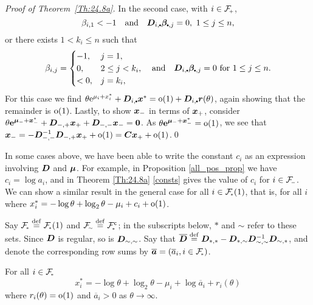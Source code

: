 \begin{proof} [Proof of Theorem~{\rm \ref{Th:24.8a}}]
In the second case, with $i\in \Fset{+}$,
\[
 \beta_{i,1}<-1 \quad \text{and} \quad
 \bfD_{i,\sbullet}  \bfbeta_{\sbullet,j}=0,\ 1 \leq j \leq n,
\]
or there exists
$1 < k_i \leq n$ such that
\[ \beta_{i,j} = \begin{cases}
	-1, & j = 1, \\
	0, & 2 \le j < k_i, \\
	< 0, & j = k_i,
\end{cases} \quad \text{and} \quad
	\bfD_{i,\sbullet}  \bfbeta_{\sbullet,j}=0 \text{ for } 1 \le j \le n.
\]
For this case we find
$ \theta \e^{\mu_i+x_i^*}+\bfD_{i,\sbullet}  \bfx^*=
 \oh(1)+\bfD_{i,\sbullet}  \bfr(\theta)$,
again showing that the remainder is ${\mathrm{o}}(1)$. Lastly, to show $\bm{x}_{-}$ in
terms of $\bm{x}_{+}$, consider $\theta \bm{\mathrm{e}}^{\bm{\mu}_{-} + \bm{x}_{-}^*} +
\bm{D}_{{-},{+}} \bm{x}_{+} + \bm{D}_{{-},{-}} \bm{x}_{-} = \bm{0}$. As $\theta
\bm{\mathrm{e}}^{\bm{\mu}_{-} + \bm{x}_{-}^*} = {\mathrm{o}}(1)$, we see that $\bm{x}_{-} =
-\bm{D}_{{-},{-}}^{-1} \bm{D}_{{-},{+}} \bm{x}_{+} + {\mathrm{o}}(1)= \bm{C} \bm{x}_{+} +
{\mathrm{o}}(1)$.\qed
\end{proof}

In some cases above, we have been able to write the constant $c_i$ as an
expression involving $\bm{D}$ and $\bm{\mu}$. For example, in Proposition
\ref{all_pos_prop} we have $c_i = \log a_i$, and in Theorem \ref{Th:24.8a}
\eqref{consts} gives the value of $c_i$ for $i \in \Fset{-}$. We can show a
similar result in the general case for all $i \in \Fset{*}(1)$, that is, for
all $i$ where $x_i^* = -\log \theta + \log_2 \theta - \mu_i + c_i + {\mathrm{o}}(1)$.

Say $\Fset{*} \defeq \Fset{*}(1)$ and $\Fset{\sim} \defeq \Fset{*}^\comp$; in
the subscripts below, $*$ and $\sim$ refer to these sets. Since $\bm{D}$ is
regular, so is $\bm{D}_{{\sim},{\sim}}$. Say that $\overline{\bm{D}} \overset{\mathrm{def}}{=}
\bm{D}_{{*},{*}}-\bm{D}_{{*},{\sim}}\bm{D}_{{\sim},{\sim}}^{-1}\bm{D}_{{\sim},{*}}$,
and denote the corresponding row sums by $\overline{\bfa} = (\overline{a}_i, i
\in \Fset{*})$.

\begin{corollary}\label{Cor:24.8d}
For all $i \in \Fset{*}$
\[
    x_i^* = {-}\log \theta + \log_2 \theta - \mu_i + \log \overline{a}_i + r_i(\theta)
\]
where $r_i(\theta) = {\mathrm{o}}(1)$ and $\overline{a}_i > 0$ as $\theta \to \infty$.
\end{corollary}

